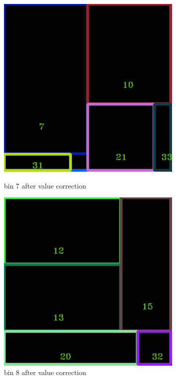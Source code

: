\documentclass[11pt]{article}
\begin{document}
    \begin{figure}
    \begin{minipage}[htb]{0.33\linewidth}
    \centering
    \includegraphics[width=0.8\textwidth]{FIGS/2/output7.png}
    \caption{bin 7 after value correction}
    \label{skyline}
    \end{minipage}
    \begin{minipage}[htb]{0.33\linewidth}
    \centering
    \includegraphics[width=0.8\textwidth]{FIGS/2/output8.png}
    \caption{bin 8 after value correction}
    \label{skyline}
    \end{minipage}

\end{figure}
\end{document}
